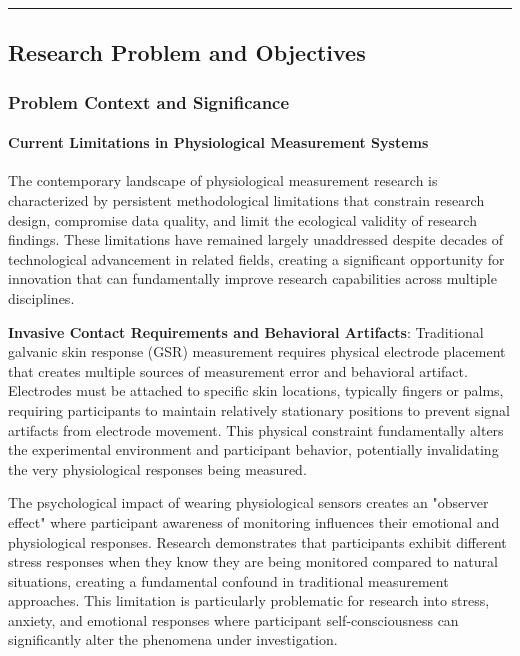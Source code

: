 \documentclass[11pt,a4paper]{report}
\begin{document}
\hrule

\subsection{Research Problem and Objectives}

\subsubsection{Problem Context and Significance}

\paragraph{Current Limitations in Physiological Measurement Systems}

The contemporary landscape of physiological measurement research is characterized by persistent methodological
limitations that constrain research design, compromise data quality, and limit the ecological validity of research
findings. These limitations have remained largely unaddressed despite decades of technological advancement in related
fields, creating a significant opportunity for innovation that can fundamentally improve research capabilities across
multiple disciplines.

\textbf{Invasive Contact Requirements and Behavioral Artifacts}: Traditional galvanic skin response (GSR) measurement
requires physical electrode placement that creates multiple sources of measurement error and behavioral artifact.
Electrodes must be attached to specific skin locations, typically fingers or palms, requiring participants to maintain
relatively stationary positions to prevent signal artifacts from electrode movement. This physical constraint
fundamentally alters the experimental environment and participant behavior, potentially invalidating the very
physiological responses being measured.

The psychological impact of wearing physiological sensors creates an "observer effect" where participant awareness of
monitoring influences their emotional and physiological responses. Research demonstrates that participants exhibit
different stress responses when they know they are being monitored compared to natural situations, creating a
fundamental confound in traditional measurement approaches. This limitation is particularly problematic for research
into stress, anxiety, and emotional responses where participant self-consciousness can significantly alter the phenomena
under investigation.
\end{document}
